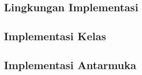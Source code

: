 \subsection{Lingkungan Implementasi}
\label{subsec:0501-lingkungan-implementasi}



\subsection{Implementasi Kelas}
\label{subsec:0501-implementasi-kelas}



\subsection{Implementasi Antarmuka}
\label{subsec:0501-implementasi-antarmuka}
